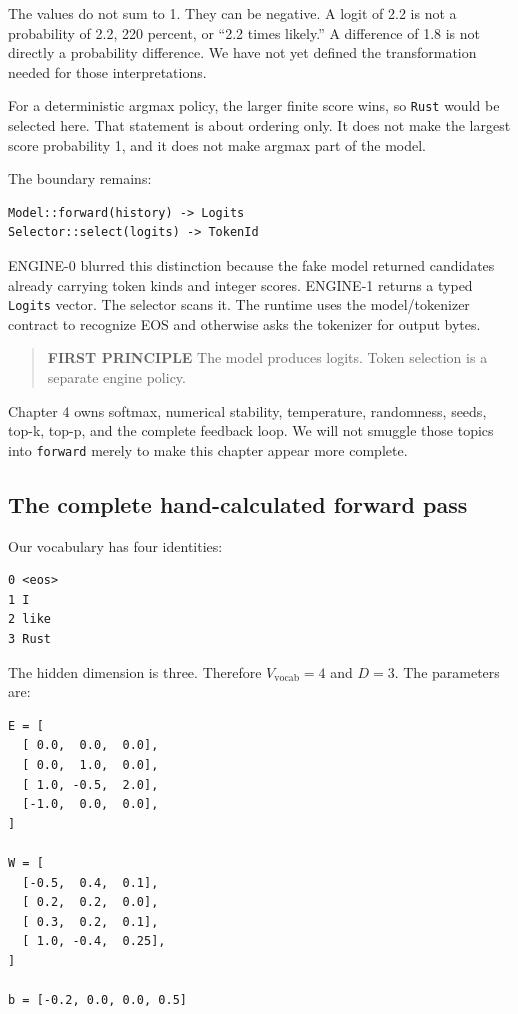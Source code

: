 \documentclass[
  10pt,
]{article}
\begin{document}
The values do not sum to 1. They can be negative. A logit of 2.2 is not
a probability of 2.2, 220 percent, or ``2.2 times likely.'' A difference
of 1.8 is not directly a probability difference. We have not yet defined
the transformation needed for those interpretations.

For a deterministic argmax policy, the larger finite score wins, so
\texttt{Rust} would be selected here. That statement is about ordering
only. It does not make the largest score probability 1, and it does not
make argmax part of the model.

The boundary remains:

\begin{verbatim}
Model::forward(history) -> Logits
Selector::select(logits) -> TokenId
\end{verbatim}

ENGINE-0 blurred this distinction because the fake model returned
candidates already carrying token kinds and integer scores. ENGINE-1
returns a typed \texttt{Logits} vector. The selector scans it. The
runtime uses the model/tokenizer contract to recognize EOS and otherwise
asks the tokenizer for output bytes.

\begin{quote}
\textbf{FIRST PRINCIPLE} The model produces logits. Token selection is a
separate engine policy.
\end{quote}

Chapter 4 owns softmax, numerical stability, temperature, randomness,
seeds, top-k, top-p, and the complete feedback loop. We will not smuggle
those topics into \texttt{forward} merely to make this chapter appear
more complete.

\subsection{The complete hand-calculated forward
pass}\label{the-complete-hand-calculated-forward-pass}

Our vocabulary has four identities:

\begin{verbatim}
0 <eos>
1 I
2 like
3 Rust
\end{verbatim}

The hidden dimension is three. Therefore \(V_{\mathrm{vocab}}=4\) and
\(D=3\). The parameters are:

\begin{verbatim}
E = [
  [ 0.0,  0.0,  0.0],
  [ 0.0,  1.0,  0.0],
  [ 1.0, -0.5,  2.0],
  [-1.0,  0.0,  0.0],
]

W = [
  [-0.5,  0.4,  0.1],
  [ 0.2,  0.2,  0.0],
  [ 0.3,  0.2,  0.1],
  [ 1.0, -0.4,  0.25],
]

b = [-0.2, 0.0, 0.0, 0.5]
\end{verbatim}
\end{document}
